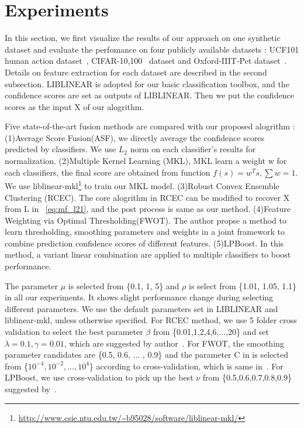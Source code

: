 \documentclass[letterpaper]{article}
\begin{document}
\section{Experiments}

In this section, we first visualize the results of our approach on one synthetic dataset 
and evaluate the perfomance on four publicly available datasets : UCF101 human action dataset~\cite{soomro2012ucf101}, CIFAR-10,100~\cite{krizhevsky2009learning} dataset and Oxford-IIIT-Pet dataset~\cite{parkhi12a}. 
Details on feature extraction for each dataset are described in the second subsection.
LIBLINEAR\cite{fan2008liblinear} is adopted for our basic classification toolbox, and the confidence scores are set as outputs of LIBLINEAR. 
Then we put the confidence scores as the input X of our alogrithm.


Five state-of-the-art fusion methods are compared with our proposed alogrithm : 
(1)Average Score Fusion(ASF), we directly average the confidence scores predicted by classifiers. We use $L_2$ norm on each classifier's results for normalization. 
(2)Multiple Kernel Learning (MKL),  MKL learn a weight w for each classifiers, the final score are obtained from function $f(s)=w^{T}s, \sum w = 1$. We use liblinear-mkl\footnote{\url{http://www.csie.ntu.edu.tw/~b95028/software/liblinear-mkl/}} to train our MKL model. 
(3)Robust Convex Ensemble Clustering (RCEC)\cite{gaoijcai2016robust}. The core alogrithm in RCEC can be modified to recover X from L in ~\ref{eq:mf_l21}, and the post process is same as our method. 
(4)Feature Weighting via Optimal Thresholding(FWOT)\cite{xuiccv2013feature}. The author propse a method to learn thresholding, smoothing parameters and weights in a joint framework to combine prediction confidence scores of different features. 
(5)LPBoost\cite{gehler2009feature}. In this method, a variant linear combination are applied to multiple classifiers to boost performance.


The parameter $\mu$ is selected from \{0.1, 1, 5\} and $\rho$ is select from \{1.01, 1.05, 1.1\} in all our experiments.
It shows slight performance change during selecting different parameters. 
We use the default parameters set in LIBLINEAR and liblinear-mkl, unless otherwise specified. 
For RCEC method, we use 5 folder cross validation to select the best parameter $\beta$ from \{0.01,1,2,4,6,...,20\} and set $\lambda = 0.1, \gamma = 0.01$, which are suggested by author~\cite{yiicdm2012robust}.
For FWOT, the smoothing parameter candidates are \{0.5, 0.6, ... , 0.9\} and the parameter C in is selected from \{$10^{-4},10^{-2},...,10^{4}$\} according to cross-validation, which is same in~\cite{xuiccv2013feature}. 
For LPBoost, we use cross-validation to pick up the best $\nu$ from \{0.5,0.6,0.7,0.8,0.9\} suggested by~\cite{xuiccv2013feature}.
\end{document}
